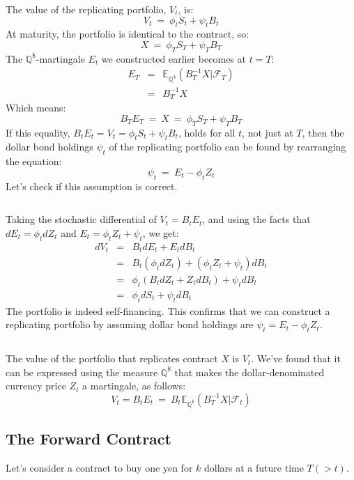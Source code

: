 \documentclass[uplatex,a4j,12pt,dvipdfmx]{jsarticle}
\begin{document}
The value of the replicating portfolio, $V_{t}$, is:
$$
	V_{t}
	\ = \
	\phi_{t} S_{t} + \psi_{t} B_{t}
$$
At maturity, the portfolio is identical to the contract, so:
$$
	X
	\ = \
	\phi_{T} S_{T} + \psi_{T} B_{T}
$$
The $\mathbb{Q}^{\$}$-martingale $E_{t}$ we constructed earlier becomes at $t=T$:
%
%
\begin{eqnarray*}
	E_{T}
	&=&
	\mathbb{E}_{\mathbb{Q}^{ \$ }}
	( B_{T}^{-1} X | \mathcal{F}_{T} )
	\\ &=&
	B_{T}^{-1} X
\end{eqnarray*}
%
%
Which means:
$$
	B_{T} E_{T}
	\ = \
	X
	\ = \
	\phi_{T} S_{T} + \psi_{T} B_{T}
$$
If this equality, $B_{t} E_{t} = V_{t} = \phi_{t} S_{t} + \psi_{t} B_{t}$, holds for all $t$, not just at $T$, then the dollar bond holdings $\psi_{t}$ of the replicating portfolio can be found by rearranging the equation:
$$
	\psi_{t}
	\ = \
	E_{t} - \phi_{t} Z_{t}
$$
Let's check if this assumption is correct.

${}$

Taking the stochastic differential of $V_{t} = B_{t} E_{t}$, and using the facts that $dE_{t} = \phi_{t} dZ_{t}$ and $E_{t} = \phi_{t} Z_{t} + \psi_{t}$, we get:
%
%
\begin{eqnarray*}
	d V_{t}
	&=&
	B_{t} d E_{t}
	+
	E_{t} d B_{t}
	\\ &=&
	B_{t} ( \phi_{t} dZ_{t} )
	+
	( \phi_{t} Z_{t} + \psi_{t} ) d B_{t}
	\\ &=&
	\phi_{t}
	(B_{t} dZ_{t} + Z_{t} dB_{t})
	+
	\psi_{t}
	dB_{t}
	\\ &=&
	\phi_{t}
	dS_{t}
	+
	\psi_{t}
	dB_{t}
\end{eqnarray*}
%
%
The portfolio is indeed self-financing. This confirms that we can construct a replicating portfolio by assuming dollar bond holdings are $\psi_{t} = E_{t} - \phi_{t} Z_{t}$.

${}$

The value of the portfolio that replicates contract $X$ is $V_{t}$. We've found that it can be expressed using the measure $\mathbb{Q}^{ \$ }$ that makes the dollar-denominated currency price $Z_{t}$ a martingale, as follows:
$$
	V_{t}
	=
	B_{t} E_{t}
	\ = \
	B_{t}
	\mathbb{E}_{\mathbb{Q}^{ \$ }}
	( B_{T}^{-1} X | \mathcal{F}_{t} )
$$
\subsection{The Forward Contract}

Let's consider a contract to buy one yen for $k$ dollars at a future time $T(>t)$.
\end{document}
